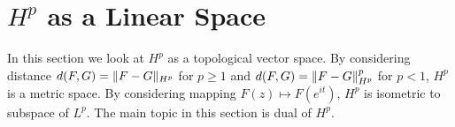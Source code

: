 % 
\section{$H^p$ as a Linear Space}
In this section we look at $H^p$ as a topological vector space. By considering distance $d(F,G)=\lVert F-G\rVert_{H^p}$ for $p\geq 1$ and
$d(F,G)=\lVert F-G\rVert_{H^p}^p$ for $p<1$, $H^p$ is a metric space. By considering mapping $F(z)\mapsto F(e^{it})$, $H^p$ is isometric
to subspace of $L^p$. The main topic in this section is dual of $H^p$.
